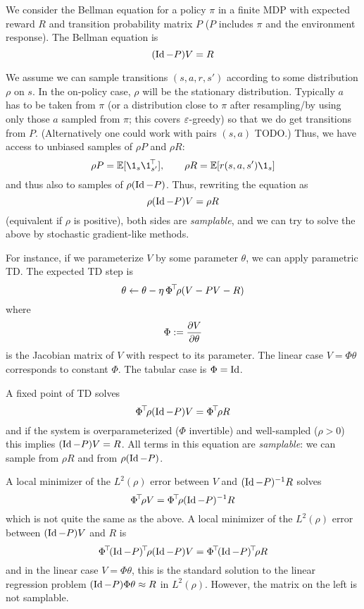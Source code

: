 \documentclass[11pt,a4paper]{article}
\begin{document}
We consider the Bellman equation for a policy $\pi$ in a finite MDP with
expected reward $R$ and transition probability matrix $P$ ($P$ includes $\pi$ and
the environment response). The Bellman equation is
\begin{equation}
(\operatorname{Id}-P)V=R
\end{equation}

We assume we can sample transitions $(s,a,r,s')$ according to some
distribution $\rho$ on $s$. In the on-policy case, $\rho$ will be the
stationary distribution. Typically $a$ has to be taken from $\pi$ (or a
distribution close to $\pi$ after resampling/by using only those $a$
sampled from $\pi$; this covers $\varepsilon$-greedy) so that we do get
transitions from
$P$. (Alternatively one could work with pairs $(s,a)$ TODO.) Thus, we
have access to unbiased samples of $\rho P$ and $\rho R$:
\begin{equation}
\rho P=\E[\1_{s}\transp{\1_{s'}}\,],\qquad \rho R=\E[r(s,a,s')\1_{s}]
\end{equation}
and thus also to samples of $\rho(\operatorname{Id}-P)$. Thus, rewriting the equation
as
\begin{equation}
\rho(\operatorname{Id}-P)V=\rho R
\end{equation}
(equivalent if $\rho$ is positive), both sides are \emph{samplable}, and we can try to solve the above by
stochastic gradient-like methods.

For instance, if we parameterize $V$ by some parameter $\theta$, we can apply
parametric TD. The expected TD step is
\begin{equation}
\theta\gets \theta -\eta \,\Phi^{\!\top}\!\rho (V-PV-R)
\end{equation}
where 
\begin{equation}
\Phi\mathrel{\mathop{:}}= \frac{\partial V}{\partial \theta}
\end{equation}
is the Jacobian matrix of $V$ with respect to its parameter. The linear
case $V=\Phi \theta$ corresponds to constant $\Phi$. The tabular case is
$\Phi=\operatorname{Id}$.

A fixed point of TD solves
\begin{equation}
\Phi^{\!\top}\!\rho(\operatorname{Id}-P)V=\Phi^{\!\top}\!\rho R
\end{equation}
and if the system is overparameterized ($\Phi$ invertible) and
well-sampled ($\rho>0$) this implies $(\operatorname{Id}-P)V=R$. All terms in this
equation are \emph{samplable}: we can sample from $\rho R$ and from
$\rho(\operatorname{Id}-P)$.

A local minimizer of the $L^2(\rho)$ error between $V$ and
$(\operatorname{Id}-P)^{-1}R$ solves
\begin{equation}
\Phi^{\!\top}\! \rho V=\Phi^{\!\top}\!\rho (\operatorname{Id}-P)^{-1} R
\end{equation}
which is not quite the same as the above. A local minimizer of the
$L^2(\rho)$ error between $(\operatorname{Id}-P)V$ and $R$ is
\begin{equation}
\transp{\Phi}\transp{(\Id-P)}\rho(\Id-P)V=\transp{\Phi}\transp{(\Id-P)}\rho R
\end{equation}
and in the linear case $V=\Phi\theta$, this is the standard solution to
the linear regression problem $(\operatorname{Id}-P)\Phi\theta\approx R$ in
$L^2(\rho)$. However, the matrix on the left is not samplable.
\end{document}
